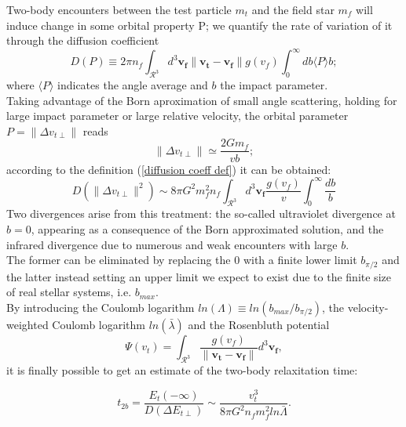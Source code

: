 Two-body encounters between the test particle $m_t$ and the field star $m_f$ will induce change in some orbital property P; we quantify the rate of variation of it through the diffusion coefficient
\begin{equation}\label{diffusion coeff def}
    D(P)\equiv 2\pi n_f\int_\mathcal{R^3} d^3\mathbf{v_f}\|\mathbf{v_t}-\mathbf{v_f}\|g(v_f)\int_0^\infty db\langle P\rangle b;
 \end{equation}
where $\langle P\rangle$ indicates the angle average and $b$ the impact parameter.\\Taking advantage of the Born aproximation of small angle scattering, holding for large impact parameter or large relative velocity, the orbital parameter $P=\|\Delta v_{t\perp} \|$ reads\begin{equation}
    \|\Delta v_{t\perp} \|\simeq \frac{2Gm_f}{vb};
\end{equation}
according to the definition (\ref{diffusion coeff def}) it can be obtained:
\begin{equation}
    D(\|\Delta v_{t\perp} \|^2)\sim 8\pi G^2m_f^2n_f\int_\mathcal{R^3}d^3\mathbf{v_f}\frac{g(v_f)}{v}\int_0^\infty \frac{db}{b}
\end{equation}
Two divergences arise from this treatment: the so-called ultraviolet divergence at $b=0$, appearing as a consequence of the Born approximated solution, and the infrared divergence due to numerous and weak encounters with large $b$.\\The former can be eliminated by replacing the $0$ with a finite lower limit $b_{\pi/2}$ and the latter instead setting an upper limit we expect to exist due to the finite size of real stellar systems, i.e. $b_{max}$.\\By introducing the Coulomb logarithm $ln(\Lambda)\equiv ln(b_{max}/b_{\pi/2})$, the velocity-weighted Coulomb logarithm $ln(\bar{\lambda})$ and the Rosenbluth potential
\begin{equation}
    \Psi(v_t)=\int_\mathcal{R^3}\frac{g(v_f)}{\|\mathbf{v_t}-\mathbf{v_f}\|}d^3\mathbf{v_f},
\end{equation}
it is finally possible to get an estimate of the two-body relaxitation time:




\begin{equation}\label{t_2b}
    t_{2b}=\frac{E_t(-\infty)}{D(\Delta E_{t\perp})}\sim \frac{v_t^3}{8\pi G^2n_fm_f^2ln\bar\Lambda}.
\end{equation}

